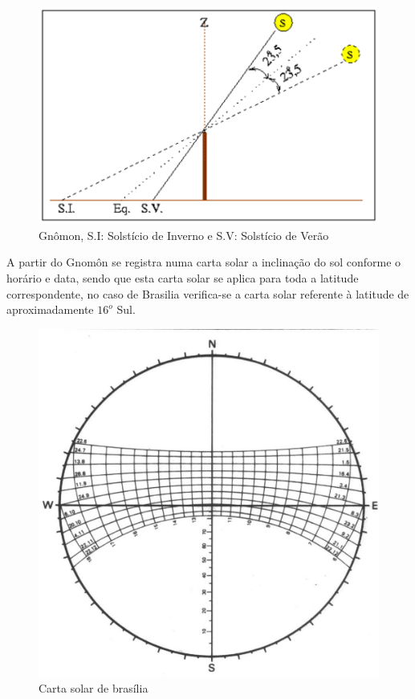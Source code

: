 \begin{figure}[H]
  \begin{center}
	\includegraphics[keepaspectratio,scale=1,angle=0]{figuras/inclinacao.eps}
	\caption{Gnômon, S.I: Solstício de Inverno e S.V: Solstício de Verão}
  \end{center}
\end{figure}

	A partir do Gnomôn se registra numa carta solar a inclinação do sol conforme o horário e data, sendo que esta carta solar se aplica para toda a latitude correspondente, no caso de Brasilia verifica-se a carta solar referente à latitude de aproximadamente $16^o$ Sul\cite{2002Maciel}.

\begin{figure}[H]
  \begin{center}
	\includegraphics[keepaspectratio,scale=0.3,angle=0]{figuras/bioclimatico.eps}
	\caption{Carta solar de brasília}
  \end{center}
\end{figure}

